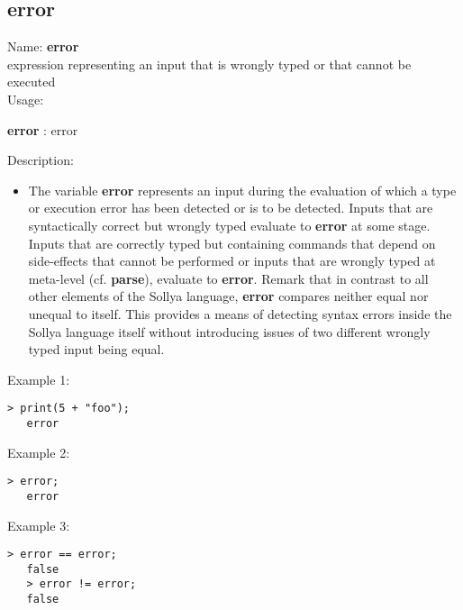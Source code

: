 \subsection{ error }
\noindent Name: \textbf{error}\\
expression representing an input that is wrongly typed or that cannot be executed\\

\noindent Usage: 
\begin{center}
\textbf{error} : \textsf{error}\\
\end{center}
\noindent Description: \begin{itemize}

\item The variable \textbf{error} represents an input during the evaluation of
   which a type or execution error has been detected or is to be
   detected. Inputs that are syntactically correct but wrongly typed
   evaluate to \textbf{error} at some stage.  Inputs that are correctly typed
   but containing commands that depend on side-effects that cannot be
   performed or inputs that are wrongly typed at meta-level (cf. \textbf{parse}),
   evaluate to \textbf{error}.
   Remark that in contrast to all other elements of the Sollya language,
   \textbf{error} compares neither equal nor unequal to itself. This provides a
   means of detecting syntax errors inside the Sollya language itself
   without introducing issues of two different wrongly typed input being
   equal.
\end{itemize}
\noindent Example 1: 
\begin{center}\begin{minipage}{14.8cm}\begin{Verbatim}[frame=single]
   > print(5 + "foo");
   error
\end{Verbatim}
\end{minipage}\end{center}
\noindent Example 2: 
\begin{center}\begin{minipage}{14.8cm}\begin{Verbatim}[frame=single]
   > error;
   error
\end{Verbatim}
\end{minipage}\end{center}
\noindent Example 3: 
\begin{center}\begin{minipage}{14.8cm}\begin{Verbatim}[frame=single]
   > error == error;
   false
   > error != error;
   false
\end{Verbatim}
\end{minipage}\end{center}
